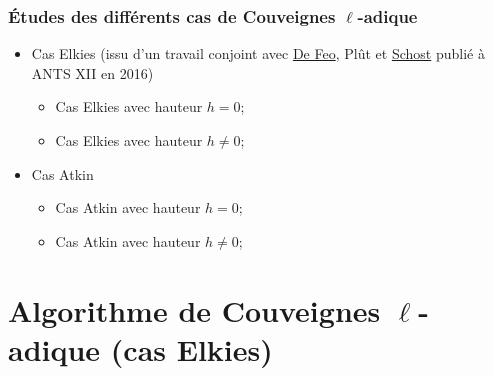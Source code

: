 \documentclass[10pt,a4paper]{beamer}
\theoremstyle{plain}
\theoremstyle{definition}
\theoremstyle{definition}
\theoremstyle{definition}
\theoremstyle{definition}
\theoremstyle{remark}
\theoremstyle{remark}
\begin{document}
\begin{frame}
\frametitle{Études des différents cas de Couveignes $\ell$-adique}
\vfill
\begin{itemize}
\item Cas Elkies (issu d'un travail conjoint avec \href{http://defeo.lu/}{De Feo}, Plût et \href{https://cs.uwaterloo.ca/~eschost/}{Schost} publié à ANTS XII en 2016)
\begin{itemize}
\vfill
\item Cas Elkies avec hauteur $h=0$;
\vfill
\item Cas Elkies avec hauteur $h \neq 0$;
\end{itemize}
\vfill
\item Cas Atkin
\begin{itemize}
\vfill 
\item Cas Atkin avec hauteur $h=0$;
\vfill
\item Cas Atkin avec hauteur $h \neq 0$;
\end{itemize}
\end{itemize}
\vfill

\end{frame}





\section{Algorithme de Couveignes $\ell$-adique (cas Elkies)}
\end{document}
